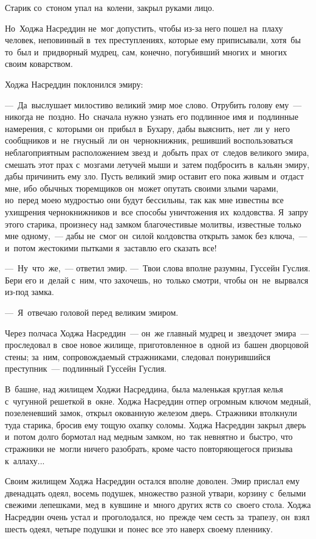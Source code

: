 \documentclass[12pt,a4paper]{book}
\begin{document}
Старик со~стоном упал на~колени, закрыл руками лицо.

Но~Ходжа Насреддин не~мог допустить, чтобы из-за него пошел на~плаху человек, неповинный в~тех преступлениях, которые ему приписывали, хотя~бы то~был и~придворный мудрец, сам, конечно, погубивший многих и~многих своим коварством.

Ходжа Насреддин поклонился эмиру:

—~Да~выслушает милостиво великий эмир мое слово. Отрубить голову ему~— никогда не~поздно. Но~сначала нужно узнать его подлинное имя и~подлинные намерения, с~которыми он~прибыл в~Бухару, дабы выяснить, нет~ли у~него сообщников и~не~гнусный~ли он~чернокнижник, решивший воспользоваться неблагоприятным расположением звезд и~добыть прах от~следов великого эмира, смешать этот прах с~мозгами летучей мыши и~затем подбросить в~кальян эмиру, дабы причинить ему зло. Пусть великий эмир оставит его пока живым и~отдаст мне, ибо обычных тюремщиков он~может опутать своими злыми чарами, но~перед моею мудростью они будут бессильны, так как мне известны все ухищрения чернокнижников и~все способы уничтожения их~колдовства. Я~запру этого старика, произнесу над замком благочестивые молитвы, известные только мне одному,~— дабы не~смог он~силой колдовства открыть замок без ключа,~— и~потом жестокими пытками я~заставлю его сказать все!

—~Ну~что~же,~— ответил эмир. —~Твои слова вполне разумны, Гуссейн Гуслия. Бери его и~делай с~ним, что захочешь, но~только смотри, чтобы он~не~вырвался из-под замка.

—~Я~отвечаю головой перед великим эмиром.

Через полчаса Ходжа Насреддин~— он~же главный мудрец и~звездочет эмира~— проследовал в~свое новое жилище, приготовленное в~одной из~башен дворцовой стены; за~ним, сопровождаемый стражниками, следовал понурившийся преступник~— подлинный Гуссейн Гуслия.

В~башне, над жилищем Ходжи Насреддина, была маленькая круглая келья с~чугунной решеткой в~окне. Ходжа Насреддин отпер огромным ключом медный, позеленевший замок, открыл окованную железом дверь. Стражники втолкнули туда старика, бросив ему тощую охапку соломы. Ходжа Насреддин закрыл дверь и~потом долго бормотал над медным замком, но~так невнятно и~быстро, что стражники не~могли ничего разобрать, кроме часто повторяющегося призыва к~аллаху...

Своим жилищем Ходжа Насреддин остался вполне доволен. Эмир прислал ему двенадцать одеял, восемь подушек, множество разной утвари, корзину с~белыми свежими лепешками, мед в~кувшине и~много других яств со~своего стола. Ходжа Насреддин очень устал и~проголодался, но~прежде чем сесть за~трапезу, он~взял шесть одеял, четыре подушки и~понес все это наверх своему пленнику.
\end{document}
